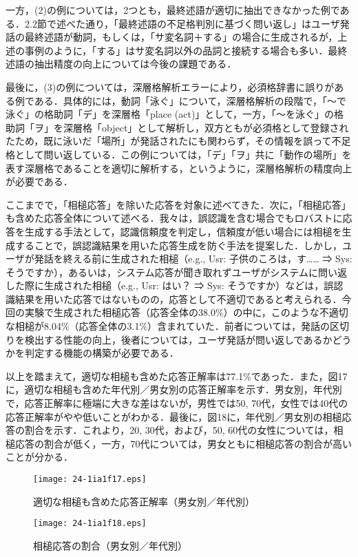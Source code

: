 \documentclass[japanese]{jnlp_1.4}
\begin{document}
一方，(2)の例については，2つとも，最終述語が適切に抽出できなかった例である．2.2節で述べた通り，「最終述語の不足格判別に基づく問い返し」はユーザ発話の最終述語が動詞，もしくは，「サ変名詞＋する」の場合に生成されるが，上述の事例のように，「する」はサ変名詞以外の品詞と接続する場合も多い．最終述語の抽出精度の向上については今後の課題である．

最後に，(3)の例については，深層格解析エラーにより，必須格辞書に誤りがある例である．具体的には，動詞「泳ぐ」について，深層格解析の段階で，「〜で泳ぐ」の格助詞「デ」を深層格「place (act)」として，一方，「〜を泳ぐ」の格助詞「ヲ」を深層格「object」として解析し，双方ともが必須格として登録されたため，既に泳いだ「場所」が発話されたにも関わらず，その情報を誤って不足格として問い返している．この例については，「デ」「ヲ」共に「動作の場所」を表す深層格であることを適切に解析する，というように，深層格解析の精度向上が必要である．

ここまでで，「相槌応答」を除いた応答を対象に述べてきた．次に，「相槌応答」も含めた応答全体について述べる．我々は，誤認識を含む場合でもロバストに応答を生成する手法として，認識信頼度を判定し，信頼度が低い場合には相槌を生成することで，誤認識結果を用いた応答生成を防ぐ手法を提案した．しかし，ユーザが発話を終える前に生成された相槌（e.g., Usr: 子供のころは，す…… ⇒ Sys: そうですか），あるいは，システム応答が聞き取れずユーザがシステムに問い返した際に生成された相槌（e.g., Usr: はい？ ⇒ Sys: そうですか）などは，誤認識結果を用いた応答ではないものの，応答として不適切であると考えられる．今回の実験で生成された相槌応答（応答全体の38.0\%）の中に，このような不適切な相槌が8.04\%（応答全体の3.1\%）含まれていた．前者については，発話の区切りを検出する性能の向上，後者については，ユーザ発話が問い返しであるかどうかを判定する機能の構築が必要である．

以上を踏まえて，適切な相槌も含めた応答正解率は77.1\%であった．また，図17に，適切な相槌も含めた年代別／男女別の応答正解率を示す．男女別，年代別で，応答正解率に極端に大きな差はないが，男性では50, 70代，女性では40代の応答正解率がやや低いことがわかる．最後に，図18に，年代別／男女別の相槌応答の割合を示す．これより，20, 30代，および，50, 60代の女性については，相槌応答の割合が低く，一方，70代については，男女ともに相槌応答の割合が高いことが分かる．

\begin{figure}[b]
\begin{center}
\texttt{[image: 24-1ia1f17.eps]}
\end{center}
\caption{適切な相槌も含めた応答正解率（男女別／年代別）}
\label{fig:17}
\end{figure}
\begin{figure}[b]
\begin{center}
\texttt{[image: 24-1ia1f18.eps]}
\end{center}
\caption{相槌応答の割合（男女別／年代別）}
\label{fig:18}
\end{figure}
\end{document}
